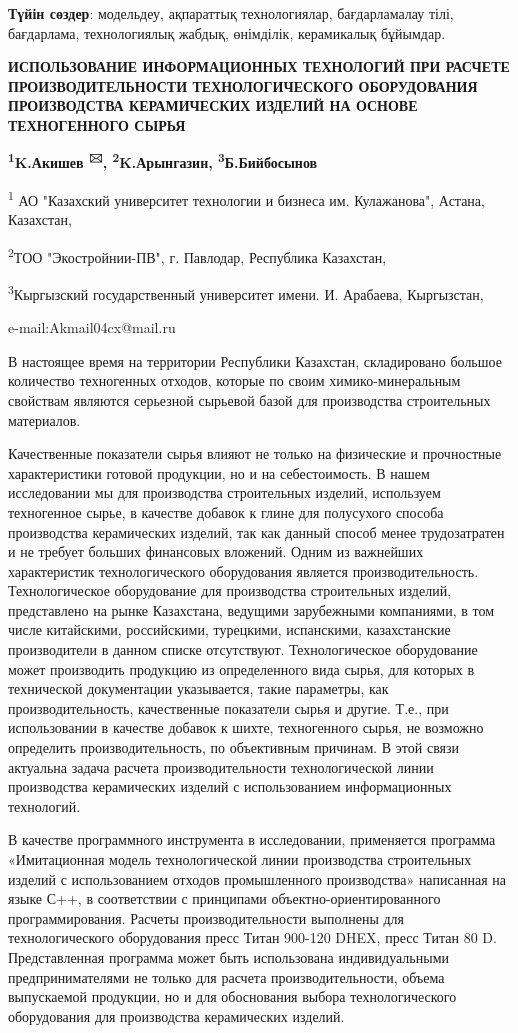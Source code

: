 {\bfseries Түйін сөздер}: модельдеу, ақпараттық технологиялар,
бағдарламалау тілі, бағдарлама, технологиялық жабдық, өнімділік,
керамикалық бұйымдар.

{\bfseries ИСПОЛЬЗОВАНИЕ ИНФОРМАЦИОННЫХ ТЕХНОЛОГИЙ ПРИ РАСЧЕТЕ
ПРОИЗВОДИТЕЛЬНОСТИ ТЕХНОЛОГИЧЕСКОГО ОБОРУДОВАНИЯ ПРОИЗВОДСТВА
КЕРАМИЧЕСКИХ ИЗДЕЛИЙ НА ОСНОВЕ ТЕХНОГЕННОГО СЫРЬЯ}

{\bfseries \textsuperscript{1}K.Акишев \textsuperscript{🖂},
\textsuperscript{2}K.Арынгазин, \textsuperscript{3}Б.Бийбосынов}

\textsuperscript{1} АО "Казахский университет технологии и бизнеса им.
Кулажанова", Астана, Казахстан,

\textsuperscript{2}ТОО "Экостройнии-ПВ", г. Павлодар, Республика
Казахстан,

\textsuperscript{3}Кыргызский государственный университет имени. И.
Арабаева, Кыргызстан,

e-mail:Akmail04cx@mail.ru

В настоящее время на территории Республики Казахстан, складировано
большое количество техногенных отходов, которые по своим
химико-минеральным свойствам являются серьезной сырьевой базой для
производства строительных материалов.

Качественные показатели сырья влияют не только на физические и
прочностные характеристики готовой продукции, но и на себестоимость. В
нашем исследовании мы для производства строительных изделий, используем
техногенное сырье, в качестве добавок к глине для полусухого способа
производства керамических изделий, так как данный способ менее
трудозатратен и не требует больших финансовых вложений. Одним из
важнейших характеристик технологического оборудования является
производительность. Технологическое оборудование для производства
строительных изделий, представлено на рынке Казахстана, ведущими
зарубежными компаниями, в том числе китайскими, российскими, турецкими,
испанскими, казахстанские производители в данном списке отсутствуют.
Технологическое оборудование может производить продукцию из
определенного вида сырья, для которых в технической документации
указывается, такие параметры, как производительность, качественные
показатели сырья и другие. Т.е., при использовании в качестве добавок к
шихте, техногенного сырья, не возможно определить производительность, по
объективным причинам. В этой связи актуальна задача расчета
производительности технологической линии производства керамических
изделий с использованием информационных технологий.

В качестве программного инструмента в исследовании, применяется
программа «Имитационная модель технологической линии производства
строительных изделий с использованием отходов промышленного
производства» написанная на языке С++, в соответствии с принципами
объектно-ориентированного программирования. Расчеты производительности
выполнены для технологического оборудования пресс Титан 900-120 DHEX,
пресс Титан 80 D. Представленная программа может быть использована
индивидуальными предпринимателями не только для расчета
производительности, объема выпускаемой продукции, но и для обоснования
выбора технологического оборудования для производства керамических
изделий.

